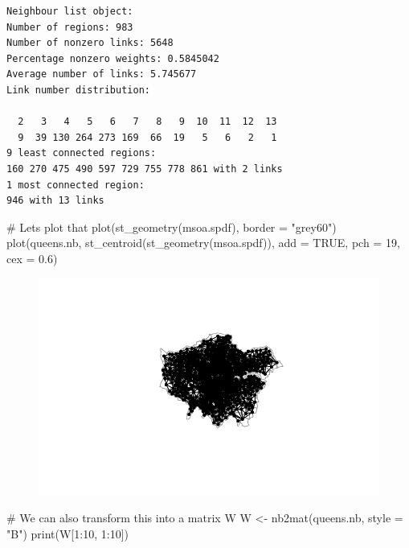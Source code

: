 \documentclass[
  letterpaper,
]{scrbook}
\newenvironment{Shaded}{\begin{snugshade}}{\end{snugshade}}
\newcommand{\AttributeTok}[1]{\textcolor[rgb]{0.40,0.45,0.13}{#1}}
\newcommand{\CommentTok}[1]{\textcolor[rgb]{0.37,0.37,0.37}{#1}}
\newcommand{\ConstantTok}[1]{\textcolor[rgb]{0.56,0.35,0.01}{#1}}
\newcommand{\DecValTok}[1]{\textcolor[rgb]{0.68,0.00,0.00}{#1}}
\newcommand{\FloatTok}[1]{\textcolor[rgb]{0.68,0.00,0.00}{#1}}
\newcommand{\FunctionTok}[1]{\textcolor[rgb]{0.28,0.35,0.67}{#1}}
\newcommand{\NormalTok}[1]{\textcolor[rgb]{0.00,0.23,0.31}{#1}}
\newcommand{\OtherTok}[1]{\textcolor[rgb]{0.00,0.23,0.31}{#1}}
\newcommand{\SpecialCharTok}[1]{\textcolor[rgb]{0.37,0.37,0.37}{#1}}
\newcommand{\StringTok}[1]{\textcolor[rgb]{0.13,0.47,0.30}{#1}}
\begin{document}
\begin{verbatim}
Neighbour list object:
Number of regions: 983 
Number of nonzero links: 5648 
Percentage nonzero weights: 0.5845042 
Average number of links: 5.745677 
Link number distribution:

  2   3   4   5   6   7   8   9  10  11  12  13 
  9  39 130 264 273 169  66  19   5   6   2   1 
9 least connected regions:
160 270 475 490 597 729 755 778 861 with 2 links
1 most connected region:
946 with 13 links
\end{verbatim}

\begin{Shaded}
\begin{Highlighting}[]
\CommentTok{\# Lets plot that}
\FunctionTok{plot}\NormalTok{(}\FunctionTok{st\_geometry}\NormalTok{(msoa.spdf), }\AttributeTok{border =} \StringTok{"grey60"}\NormalTok{)}
\FunctionTok{plot}\NormalTok{(queens.nb, }\FunctionTok{st\_centroid}\NormalTok{(}\FunctionTok{st\_geometry}\NormalTok{(msoa.spdf)), }
     \AttributeTok{add =} \ConstantTok{TRUE}\NormalTok{, }\AttributeTok{pch =} \DecValTok{19}\NormalTok{, }\AttributeTok{cex =} \FloatTok{0.6}\NormalTok{)}
\end{Highlighting}
\end{Shaded}

\begin{figure}[H]

{\centering \includegraphics{03_weights_files/figure-pdf/unnamed-chunk-4-1.pdf}

}

\end{figure}

\begin{Shaded}
\begin{Highlighting}[]
\CommentTok{\# We can also transform this into a matrix W}
\NormalTok{W }\OtherTok{\textless{}{-}} \FunctionTok{nb2mat}\NormalTok{(queens.nb, }\AttributeTok{style =} \StringTok{"B"}\NormalTok{)}
\FunctionTok{print}\NormalTok{(W[}\DecValTok{1}\SpecialCharTok{:}\DecValTok{10}\NormalTok{, }\DecValTok{1}\SpecialCharTok{:}\DecValTok{10}\NormalTok{])}
\end{Highlighting}
\end{Shaded}
\end{document}
